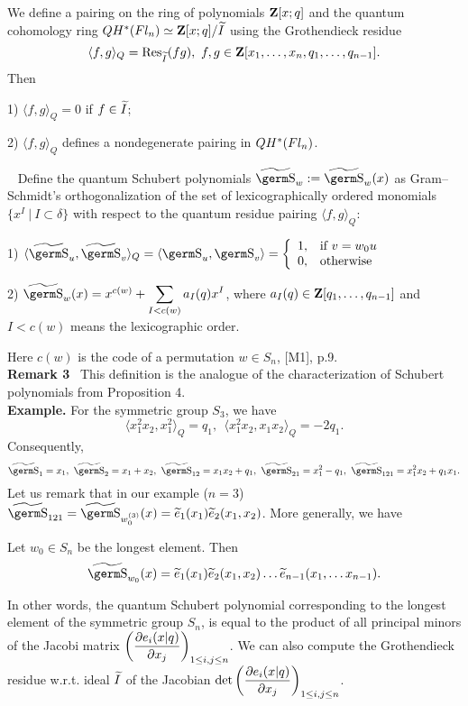 {{We define a pairing on the ring of polynomials ${\bf Z}[x;q]$ 
and the quantum cohomology
ring $QH^*(\hbox{$Fl_n$} )\simeq{\bf Z}[x;q]/\widetilde I$ using 
the Grothendieck residue
$$\langle f,g\rangle_Q=\hbox{\rm Res}_{\widetilde I}(fg),~f,g\in{\bf Z}[x_1,\ldots 
,x_n,q_1,\ldots ,q_{n-1}].
$$
Then

1) $\langle f,g\rangle_Q=0$ if $f\in \widetilde I$; 

\vskip 0.2cm

2) $\langle f,g\rangle_Q$ defines a nondegenerate pairing in $QH^*(\hbox{$Fl_n$} )$.

\begin{de}\label{102}~%
Define the quantum Schubert polynomials $\wt{\s}_w:=\wt{\s}_w(x)$ 
as Gram--Schmidt's 
orthogonalization  of the set of lexicographically ordered monomials
\hbox{$\{x^I~|~I\subset\delta\}$} with respect to the quantum residue pairing
$\langle f,g\rangle_Q$:

1) $\langle\wt{\s}_u,\wt{\s}_v\rangle_Q=\langle\s_u,\s_v\rangle 
=\left\{\begin{array}{ll} 1,& \mbox{\rm{if} $v=w_0 u$}\\ 0,
& \mbox{\rm{otherwise}}\end{array}\right.$

2) $\wt{\s}_w(x)=x^{c(w)}+\ds\sum_{I<c(w)}a_I(q)x^I$, where 
$a_I(q)\in{\bf Z}[q_1,\ldots ,q_{n-1}]$ and\break $I<c(w)$ means the 
lexicographic order.
\end{de}
Here $c(w)$ is the code of a permutation $w\in S_n$, [M1], p.9.\medskip \\
{\bf Remark 3} \ This definition is the analogue of the 
characterization of Schubert polynomials from Proposition 4. 
\smallskip \\ 
{\bf Example.} For the symmetric group $S_3$, we have
$$\langle x_1^2x_2,x_1^2\rangle_Q=q_1,~~\langle 
x_1^2x_2,x_1x_2\rangle_Q=-2q_1.
$$
Consequently,
$$\wt{\s}_1=x_1,~\wt{\s}_2=x_1+x_2,~\wt{\s}_{12}=x_1x_2+q_1,~\wt{\s}_{21}=
x_1^2-q_1,~\wt{\s}_{121}=x_1^2x_2+q_1x_1.
$$
Let us remark that in our example ($n=3$) 
$\wt{\s}_{121}=\wt{\s}_{w_0^{(3)}}(x)=\wt e_1(x_1)\wt e_2(x_1,x_2)$. More 
generally, we have

\begin{pr} Let $w_0\in S_n$ be the longest element. Then
$$\wt{\s}_{w_0}(x)=\wt e_1(x_1)\wt e_2(x_1,x_2)\ldots \wt 
e_{n-1}(x_1,\ldots x_{n-1}).
$$
\end{pr}

In other words, the quantum Schubert polynomial corresponding to the 
longest element of the symmetric group $S_n$, is equal to the product of 
all principal minors of the Jacobi matrix $\displaystyle\left(\frac{\partial
e_i(x|q)}{\partial x_j}\right)_{1\le i,j\le n}$. We can also compute the 
Grothendieck residue w.r.t. ideal $\widetilde I$ of the Jacobian 
$\det\displaystyle\left(\frac{\partial e_i(x|q)}{\partial x_j}\right)_{1\le 
i,j\le n}$.

}}
